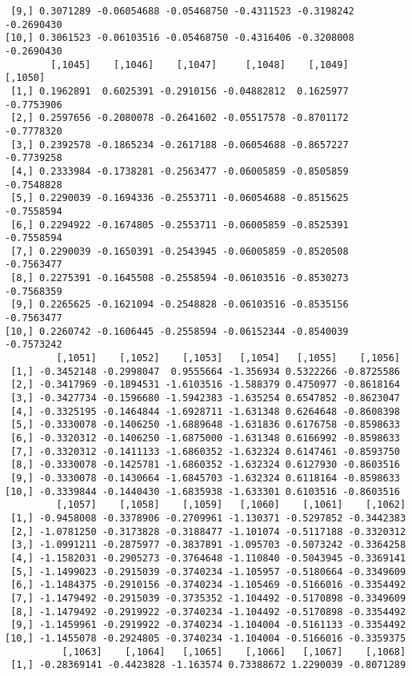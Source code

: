\documentclass[
  letterpaper,
  DIV=11,
  numbers=noendperiod]{scrreprt}
\begin{document}
\begin{verbatim}
 [9,] 0.3071289 -0.06054688 -0.05468750 -0.4311523 -0.3198242 -0.2690430
[10,] 0.3061523 -0.06103516 -0.05468750 -0.4316406 -0.3208008 -0.2690430
        [,1045]    [,1046]    [,1047]     [,1048]    [,1049]    [,1050]
 [1,] 0.1962891  0.6025391 -0.2910156 -0.04882812  0.1625977 -0.7753906
 [2,] 0.2597656 -0.2080078 -0.2641602 -0.05517578 -0.8701172 -0.7778320
 [3,] 0.2392578 -0.1865234 -0.2617188 -0.06054688 -0.8657227 -0.7739258
 [4,] 0.2333984 -0.1738281 -0.2563477 -0.06005859 -0.8505859 -0.7548828
 [5,] 0.2290039 -0.1694336 -0.2553711 -0.06054688 -0.8515625 -0.7558594
 [6,] 0.2294922 -0.1674805 -0.2553711 -0.06005859 -0.8525391 -0.7558594
 [7,] 0.2290039 -0.1650391 -0.2543945 -0.06005859 -0.8520508 -0.7563477
 [8,] 0.2275391 -0.1645508 -0.2558594 -0.06103516 -0.8530273 -0.7568359
 [9,] 0.2265625 -0.1621094 -0.2548828 -0.06103516 -0.8535156 -0.7563477
[10,] 0.2260742 -0.1606445 -0.2558594 -0.06152344 -0.8540039 -0.7573242
         [,1051]    [,1052]    [,1053]   [,1054]   [,1055]    [,1056]
 [1,] -0.3452148 -0.2998047  0.9555664 -1.356934 0.5322266 -0.8725586
 [2,] -0.3417969 -0.1894531 -1.6103516 -1.588379 0.4750977 -0.8618164
 [3,] -0.3427734 -0.1596680 -1.5942383 -1.635254 0.6547852 -0.8623047
 [4,] -0.3325195 -0.1464844 -1.6928711 -1.631348 0.6264648 -0.8608398
 [5,] -0.3330078 -0.1406250 -1.6889648 -1.631836 0.6176758 -0.8598633
 [6,] -0.3320312 -0.1406250 -1.6875000 -1.631348 0.6166992 -0.8598633
 [7,] -0.3320312 -0.1411133 -1.6860352 -1.632324 0.6147461 -0.8593750
 [8,] -0.3330078 -0.1425781 -1.6860352 -1.632324 0.6127930 -0.8603516
 [9,] -0.3330078 -0.1430664 -1.6845703 -1.632324 0.6118164 -0.8598633
[10,] -0.3339844 -0.1440430 -1.6835938 -1.633301 0.6103516 -0.8603516
         [,1057]    [,1058]    [,1059]   [,1060]    [,1061]    [,1062]
 [1,] -0.9458008 -0.3378906 -0.2709961 -1.130371 -0.5297852 -0.3442383
 [2,] -1.0781250 -0.3173828 -0.3188477 -1.101074 -0.5117188 -0.3320312
 [3,] -1.0991211 -0.2875977 -0.3837891 -1.095703 -0.5073242 -0.3364258
 [4,] -1.1582031 -0.2905273 -0.3764648 -1.110840 -0.5043945 -0.3369141
 [5,] -1.1499023 -0.2915039 -0.3740234 -1.105957 -0.5180664 -0.3349609
 [6,] -1.1484375 -0.2910156 -0.3740234 -1.105469 -0.5166016 -0.3354492
 [7,] -1.1479492 -0.2915039 -0.3735352 -1.104492 -0.5170898 -0.3349609
 [8,] -1.1479492 -0.2919922 -0.3740234 -1.104492 -0.5170898 -0.3354492
 [9,] -1.1459961 -0.2919922 -0.3740234 -1.104004 -0.5161133 -0.3354492
[10,] -1.1455078 -0.2924805 -0.3740234 -1.104004 -0.5166016 -0.3359375
          [,1063]    [,1064]   [,1065]    [,1066]   [,1067]    [,1068]
 [1,] -0.28369141 -0.4423828 -1.163574 0.73388672 1.2290039 -0.8071289

\end{verbatim}
\end{document}
